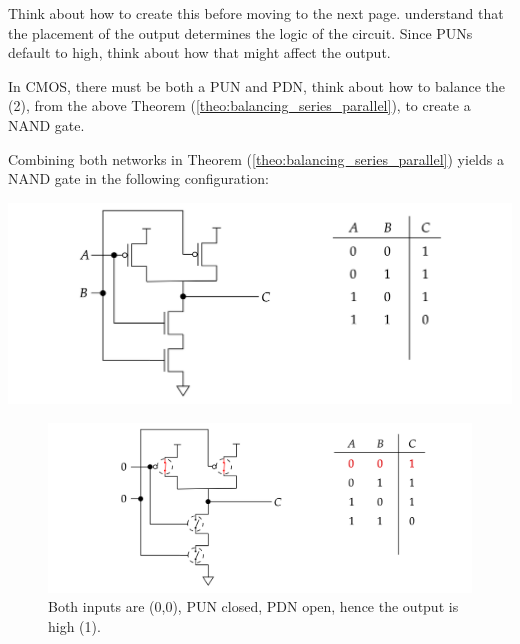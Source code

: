 \begin{Tip} Think about how to create this before moving to the next page.
  understand that the placement of the output determines the logic of the circuit. 
  Since PUNs default to high, think about how that might affect the output.

  In CMOS, there must be both a PUN and PDN, think about how to balance the (2), from the above Theorem (\ref{theo:balancing_series_parallel}), to create a NAND gate.
\end{Tip}



\newpage
\begin{theo}

  \label{def:mosfet_logic_gate_nand}

  \noindent
  Combining both networks in Theorem (\ref{theo:balancing_series_parallel}) yields a NAND gate in the following configuration:

  \begin{center}
    \includegraphics[width=\textwidth]{Sections/circuits/nand.png}
  \end{center}
\end{theo}

\vspace{2em}
\begin{figure}[ht!]
  \centering
  \includegraphics[width=\textwidth]{Sections/circuits/nand_1.png}
  \caption{Both inputs are (0,0), PUN closed, PDN open, hence the output is high (1).}
  \label{fig:nand-1}
\end{figure}

